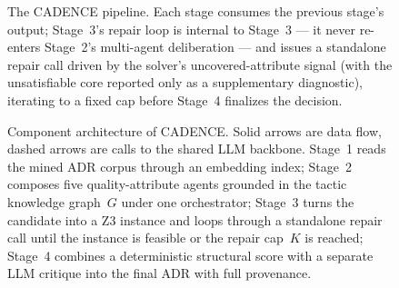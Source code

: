 \documentclass[preprint,12pt,authoryear]{elsarticle}
\renewcommand{\_}{\textunderscore\allowbreak{}}
\begin{document}
\begin{figure}[!htbp]
\centering
{}
\caption{The CADENCE pipeline. Each stage consumes the previous stage's output; Stage~3's repair loop is internal to Stage~3 --- it never re-enters Stage~2's multi-agent deliberation --- and issues a standalone repair call driven by the solver's uncovered-attribute signal (with the unsatisfiable core reported only as a supplementary diagnostic), iterating to a fixed cap before Stage~4 finalizes the decision.\label{fig:pipeline}}
\end{figure}
\FloatBarrier

\begin{figure}[!htbp]
\centering
{}
\caption{Component architecture of CADENCE. Solid arrows are data flow, dashed arrows are calls to the shared LLM backbone. Stage~1 reads the mined ADR corpus through an embedding index; Stage~2 composes five quality-attribute agents grounded in the tactic knowledge graph~$G$ under one orchestrator; Stage~3 turns the candidate into a Z3 instance and loops through a standalone repair call until the instance is feasible or the repair cap~$K$ is reached; Stage~4 combines a deterministic structural score with a separate LLM critique into the final ADR with full provenance.\label{fig:architecture}}
\end{figure}
\FloatBarrier
\end{document}
